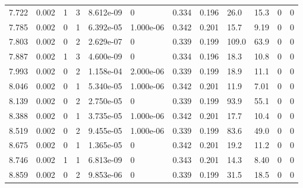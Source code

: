 \documentclass[preview]{standalone}
\begin{document}
{{{\begin{tabular}{L{1.2cm}C{1.2cm} C{0.3cm}C{0.5cm} C{1.4cm}C{1.4cm} C{1.4cm}C{1.4cm} C{1.6cm}C{1.6cm} C{1.6cm}C{1.6cm}}
  7.722  &  0.002  & 1     &  3 &  8.612e-09  & 0  &  0.334&   0.196& 26.0 & 15.3   &  0 & 0  \\ 
  7.785  &  0.002  & 0     &  1 &  6.392e-05  & 1.000e-06  &  0.342&   0.201& 15.7 & 9.19   &  0 & 0  \\ 
  7.803  &  0.002  & 0     &  2 &  2.629e-07  & 0  &  0.339&   0.199& 109.0 & 63.9   &  0 & 0  \\ 
  7.887  &  0.002  & 1     &  3 &  4.600e-09  & 0  &  0.334&   0.196& 18.3 & 10.8   &  0 & 0  \\ 
  7.993  &  0.002  & 0     &  2 &  1.158e-04  & 2.000e-06  &  0.339&   0.199& 18.9 & 11.1   &  0 & 0  \\ 
  8.046  &  0.002  & 0     &  1 &  5.340e-05  & 1.000e-06  &  0.342&   0.201& 11.9 & 7.01   &  0 & 0  \\ 
  8.139  &  0.002  & 0     &  2 &  2.750e-05  & 0  &  0.339&   0.199& 93.9 & 55.1   &  0 & 0  \\ 
  8.388  &  0.002  & 0     &  1 &  3.735e-05  & 1.000e-06  &  0.342&   0.201& 17.7 & 10.4   &  0 & 0  \\ 
  8.519  &  0.002  & 0     &  2 &  9.455e-05  & 1.000e-06  &  0.339&   0.199& 83.6 & 49.0   &  0 & 0  \\ 
  8.675  &  0.002  & 0     &  1 &  1.365e-05  & 0  &  0.342&   0.201& 19.2 & 11.2   &  0 & 0  \\ 
  8.746  &  0.002  & 1     &  1 &  6.813e-09  & 0  &  0.343&   0.201& 14.3 & 8.40   &  0 & 0  \\ 
  8.859  &  0.002  & 0     &  2 &  9.853e-06  & 0  &  0.339&   0.199& 31.5 & 18.5   &  0 & 0  \\ 
\hline 
\end{tabular} 

}}}
\end{document}
